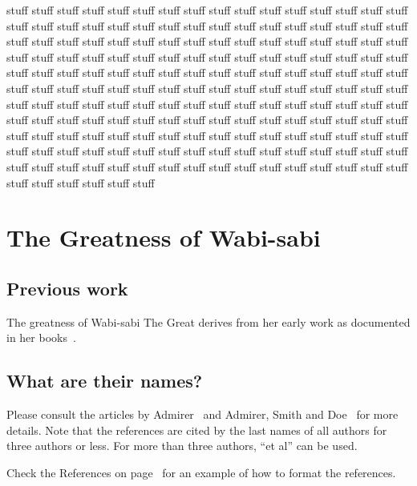 \documentclass[dissertation, proposal]{bsu-cs}  %
\begin{document}
stuff stuff stuff stuff stuff stuff stuff stuff stuff stuff stuff stuff stuff
stuff stuff stuff stuff stuff stuff stuff stuff stuff stuff stuff stuff stuff
stuff stuff stuff stuff stuff stuff stuff stuff stuff stuff stuff stuff stuff
stuff stuff stuff stuff stuff stuff stuff stuff stuff stuff stuff stuff stuff
stuff stuff stuff stuff stuff stuff stuff stuff stuff stuff stuff stuff stuff
stuff stuff stuff stuff stuff stuff stuff stuff stuff stuff stuff stuff stuff
stuff stuff stuff stuff stuff stuff stuff stuff stuff stuff stuff stuff stuff
stuff stuff stuff stuff stuff stuff stuff stuff stuff stuff stuff stuff stuff
stuff stuff stuff stuff stuff stuff stuff stuff stuff stuff stuff stuff stuff
stuff stuff stuff stuff stuff stuff stuff stuff stuff stuff stuff stuff stuff
stuff stuff stuff stuff stuff stuff stuff stuff stuff stuff stuff stuff stuff
stuff stuff stuff stuff stuff stuff stuff stuff stuff stuff stuff stuff stuff
stuff stuff stuff stuff stuff stuff stuff stuff stuff stuff stuff stuff stuff
stuff stuff stuff stuff stuff stuff stuff stuff stuff stuff stuff stuff stuff

%
%

\chapter{The Greatness of Wabi-sabi}\label{ch:wabisabiGreatness}

\section{Previous work}
The greatness of Wabi-sabi The Great derives from her early work as documented in
her books~\cite{ws:book1,ws:book2}.

\section{What are their names?}
Please consult the articles by Admirer~\cite{me:paper1} and Admirer, Smith and Doe~\cite{me:paper2}
for more details. Note that the references are cited by the last names of all authors for three
authors or less. For more than three authors, ``et al'' can be used.

Check the References on page~\pageref{references} for an example of how to format the references.
\end{document}
